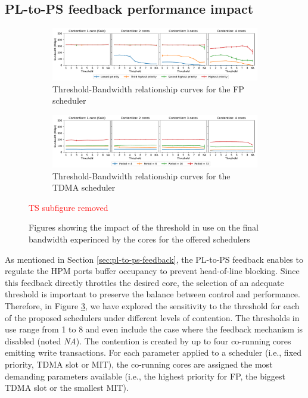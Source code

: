 \subsection{PL-to-PS feedback performance impact}
\label{sec:feedback-pressure}
\begin{figure}[]
  \centering
  \begin{subfigure}{0.9\textwidth}
    \centering
    \includegraphics[scale=0.4]{images/fp.pdf}
    \caption{Threshold-Bandwidth relationship curves for the FP scheduler}
    \label{fig:threshold_fp}
  \end{subfigure}
  \hfill
  \begin{subfigure}{0.9\textwidth}
    \centering
    \includegraphics[scale=0.4]{images/tdma.pdf}
    \caption{Threshold-Bandwidth relationship curves for the TDMA scheduler}
    \label{fig:threshold_tdma}
  \end{subfigure}
\textcolor{red}{TS subfigure removed}
  \caption{Figures showing the impact of the threshold in use on the final bandwidth experinced by the cores for the offered schedulers}
  \label{fig:schim_threshold}
\end{figure}
As mentioned in Section \ref{sec:pl-to-ps-feedback}, the PL-to-PS feedback enables
\schim to regulate the HPM ports buffer occupancy to prevent head-of-line blocking.
Since this feedback directly throttles the desired core, the selection of an adequate
threshold is important to preserve the balance between control and performance.
Therefore, in Figure \ref{fig:schim_threshold}, we have explored the sensitivity
to the threshold for each of the proposed schedulers under different levels of contention.
The thresholds in use range from 1 to 8 and even include the case where the feedback mechanism is disabled
(noted \emph{NA}). The contention is created by up to four co-running cores emitting
write transactions. For each parameter applied to a scheduler (i.e., fixed
priority, TDMA slot or MIT), the co-running cores are assigned the most
demanding parameters available (i.e., the highest priority for FP, the biggest TDMA
slot or the smallest MIT).

